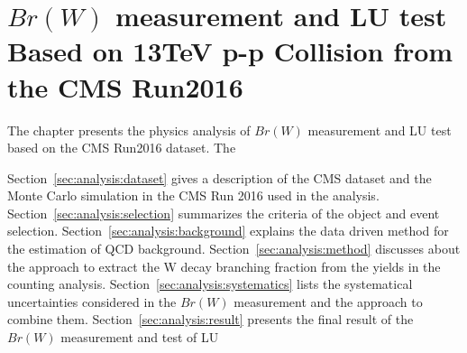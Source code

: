 \chapter{$Br(W)$ measurement and LU test Based on 13TeV p-p Collision from the CMS Run2016}
\label{sec:analysis}


The chapter presents the physics analysis of $Br(W)$ measurement and LU test based on the CMS Run2016 dataset. The


Section~\ref{sec:analysis:dataset} gives a description of the CMS dataset and the Monte Carlo simulation in the CMS Run 2016 used in the analysis. Section~\ref{sec:analysis:selection} summarizes the criteria of the object and event selection. Section~\ref{sec:analysis:background} explains the data driven method for the estimation of QCD background. Section~\ref{sec:analysis:method} discusses about the approach to extract the W decay branching fraction from the yields in the counting analysis. Section~\ref{sec:analysis:systematics} lists the systematical uncertainties considered in the $Br(W)$ measurement and the approach to combine them. Section~\ref{sec:analysis:result} presents the final result of the $Br(W)$ measurement and test of LU 



\newpage

\newpage

\newpage

\newpage

\newpage

\newpage
